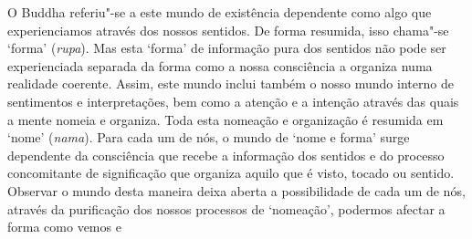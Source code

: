 O Buddha referiu"-se a este mundo de existência dependente como algo que
experienciamos através dos nossos sentidos.
De forma resumida, isso chama"-se `forma' (\emph{rupa}). Mas esta `forma' de
informação pura dos sentidos não pode ser experienciada separada da forma como a
nossa consciência a organiza numa realidade coerente. Assim, este mundo inclui
também o nosso mundo interno de sentimentos e interpretações, bem como a atenção
e a intenção através das quais a mente nomeia e organiza. Toda esta nomeação e
organização é resumida em `nome' (\emph{nama}).
Para cada um de nós, o mundo de `nome e forma' surge dependente da consciência
que recebe a informação dos sentidos e do processo concomitante de significação
que organiza aquilo que é visto, tocado ou sentido. Observar o mundo desta
maneira deixa aberta a possibilidade de cada um de nós, através da purificação
dos nossos processos de `nomeação', podermos afectar a forma como vemos e
